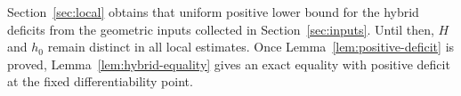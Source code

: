 Section~\ref{sec:local} obtains that uniform positive lower bound for the
hybrid deficits from the geometric inputs collected in
Section~\ref{sec:inputs}.  Until then, $H$ and $h_0$ remain distinct in all
local estimates.  Once Lemma~\ref{lem:positive-deficit} is proved,
Lemma~\ref{lem:hybrid-equality} gives an exact equality with positive
deficit at the fixed differentiability point.
